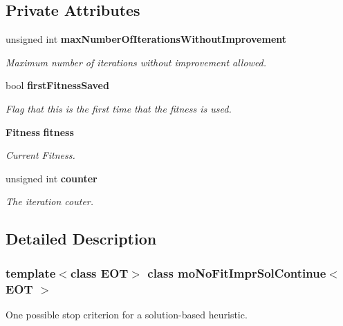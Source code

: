 \subsection*{Private Attributes}
\begin{CompactItemize}
\item 
unsigned int {\bf max\-Number\-Of\-Iterations\-Without\-Improvement}\label{classmo_no_fit_impr_sol_continue_r0}

\begin{CompactList}\small\item\em Maximum number of iterations without improvement allowed. \item\end{CompactList}\item 
bool {\bf first\-Fitness\-Saved}\label{classmo_no_fit_impr_sol_continue_r1}

\begin{CompactList}\small\item\em Flag that this is the first time that the fitness is used. \item\end{CompactList}\item 
{\bf Fitness} {\bf fitness}\label{classmo_no_fit_impr_sol_continue_r2}

\begin{CompactList}\small\item\em Current Fitness. \item\end{CompactList}\item 
unsigned int {\bf counter}\label{classmo_no_fit_impr_sol_continue_r3}

\begin{CompactList}\small\item\em The iteration couter. \item\end{CompactList}\end{CompactItemize}


\subsection{Detailed Description}
\subsubsection*{template$<$class EOT$>$ class mo\-No\-Fit\-Impr\-Sol\-Continue$<$ EOT $>$}

One possible stop criterion for a solution-based heuristic. 

